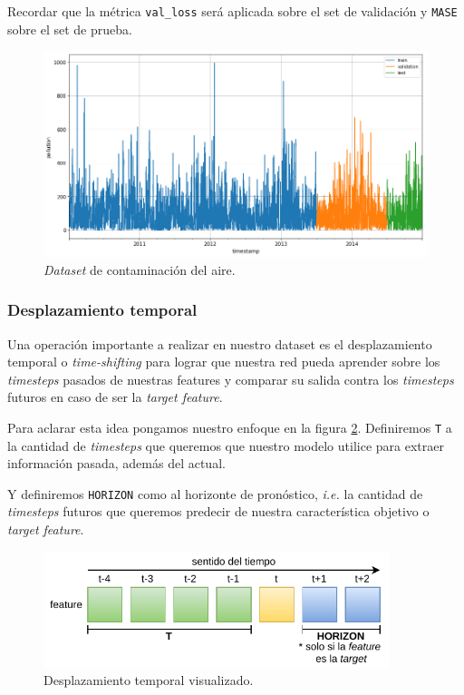 \documentclass[a4paper,12pt]{article}
\begin{document}
Recordar que la métrica \texttt{val\_loss} será aplicada sobre el set de validación y \texttt{MASE} sobre el set de prueba.

\begin{figure}[H]
	\begin{center}
	\includegraphics[width=1\textwidth]{tvt_pollution.png}
  	\caption{\textit{Dataset} de contaminación del aire.}
  	\label{fig:tvt_pollution}
  	\end{center}
\end{figure}

\subsubsection{Desplazamiento temporal}
Una operación importante a realizar en nuestro dataset es el desplazamiento temporal o \textit{time-shifting} para lograr que nuestra red pueda aprender sobre los \textit{timesteps} pasados de nuestras features y comparar su salida contra los \textit{timesteps} futuros en caso de ser la \textit{target feature}.

Para aclarar esta idea pongamos nuestro enfoque en la figura \ref{fig:shift_explain}. Definiremos \texttt{T} a la cantidad de \textit{timesteps} que queremos que nuestro modelo utilice para extraer información pasada, además del actual.

Y definiremos \texttt{HORIZON} como al horizonte de pronóstico, \textit{i.e.} la cantidad de \textit{timesteps} futuros que queremos predecir de nuestra característica objetivo o \textit{target feature}.

\begin{figure}[H]
	\begin{center}
	\includegraphics[width=0.9\textwidth]{time-shift.pdf}
  	\caption{Desplazamiento temporal visualizado.}
  	\label{fig:shift_explain}
  	\end{center}
\end{figure}
\end{document}
